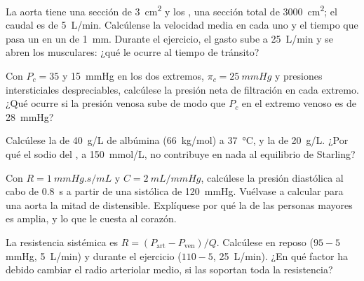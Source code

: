 \begin{exercise}[$\star\star$]\label{exo:b2:blood-circulation:7}
La aorta tiene una sección de \qty{3}{cm^2} y los , una sección
total de \qty{3000}{cm^2}; el caudal es de \qty{5}{L/min}. Calcúlense la
velocidad media en cada uno y el tiempo que pasa un  en un
 de \qty{1}{mm}. Durante el ejercicio, el gasto sube a
\qty{25}{L/min} y se abren los  musculares: ¿qué le ocurre al
tiempo de tránsito?
\end{exercise}

\begin{exercise}[$\star\star$]\label{exo:b2:blood-circulation:8}
Con $P_c = 35$ y \qty{15}{mmHg} en los dos extremos, $\pi_c =
\qty{25}{mmHg}$ y presiones intersticiales despreciables, calcúlese la
presión neta de filtración en cada extremo. ¿Qué ocurre si la presión
venosa sube de modo que $P_c$ en el extremo venoso es de \qty{28}{mmHg}?
\end{exercise}

\begin{exercise}[$\star\star$]\label{exo:b2:blood-circulation:9}
Calcúlese la  de \qty{40}{g/L} de albúmina
(\qty{66}{kg/mol}) a \qty{37}{\celsius}, y la de \qty{20}{g/L}. ¿Por qué
el sodio del , a \qty{150}{mmol/L}, no contribuye en nada al
equilibrio de Starling?
\end{exercise}

\begin{exercise}[$\star\star\star$]\label{exo:b2:blood-circulation:10}
Con $R = \qty{1}{mmHg.s/mL}$ y $C = \qty{2}{mL/mmHg}$, calcúlese la
presión diastólica al cabo de \qty{0.8}{s} a partir de una sistólica de
\qty{120}{mmHg}. Vuélvase a calcular para una aorta la mitad de distensible.
Explíquese por qué la  de las personas mayores es amplia,
y lo que le cuesta al corazón.
\end{exercise}

\begin{exercise}[$\star\star\star$]\label{exo:b2:blood-circulation:11}
La resistencia sistémica es $R = (P_{\text{art}} - P_{\text{ven}})/Q$.
Calcúlese en reposo ($95 - 5$ mmHg, \qty{5}{L/min}) y durante el ejercicio
($110 - 5$, \qty{25}{L/min}). ¿En qué factor ha debido cambiar el radio
arteriolar medio, si las  soportan toda la resistencia?
\end{exercise}

